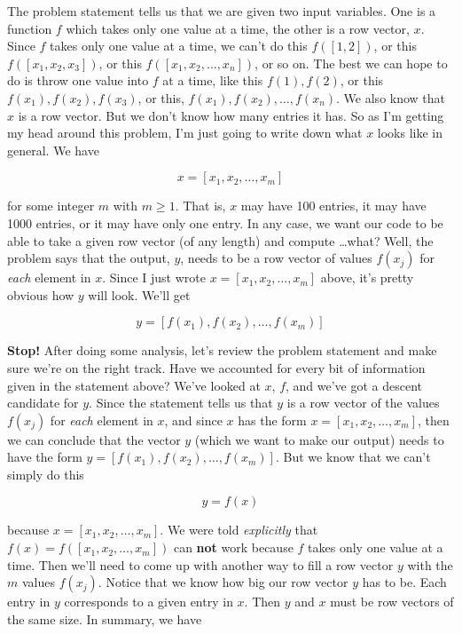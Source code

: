 \documentclass{article}
\begin{document}
The problem statement tells us that we are given two input variables. One is a function $f$ which takes only one value at a time, the other is a row vector, $x$. Since $f$ takes only one value at a time, we can't do this $f([1, 2])$, or this $f([x_1, x_2, x_3])$, or this $f([x_1, x_2, \dots, x_n])$, or so on. The best we can hope to do is throw one value into $f$ at a time, like this $f(1), f(2)$, or this $f(x_1), f(x_2), f(x_3)$, or this, $f(x_1), f(x_2), \dots, f(x_n)$. We also know that $x$ is a row vector. But we don't know how many entries it has. So as I'm getting my head around this problem, I'm just going to write down what $x$ looks like in general. We have

\[
x = [x_1, x_2, \dots, x_m]
\]

{\setlength{\parindent}{0cm}
for some integer $m$ with $m \geq 1$. That is, $x$ may have 100 entries, it may have 1000 entries, or it may have only one entry. In any case, we want our code to be able to take a given row vector (of any length) and compute \dots what? Well, the problem says that the output, $y$, needs to be a row vector of values $f(x_j)$ for \textit{each} element in $x$. Since I just wrote $x = [x_1, x_2, \dots, x_m]$ above, it's pretty obvious how $y$ will look. We'll get}

\[
y = [ f(x_1), f(x_2), \dots, f(x_m)]
\]

{\setlength{\parindent}{0cm}
\textbf{Stop!} After doing some analysis, let's review the problem statement and make sure we're on the right track. Have we accounted for every bit of information given in the statement above? We've looked at $x$, $f$, and we've got a descent candidate for $y$. Since the statement tells us that $y$ is a row vector of the values $f(x_j)$ for \textit{each} element in $x$, and since $x$ has the form $x = [x_1, x_2, \dots, x_m]$, then we can conclude that the vector $y$ (which we want to make our output) needs to have the form $y = [ f(x_1), f(x_2), \dots, f(x_m)]$. But we know that we can't simply do this}

\[
y = f(x)
\]

{\setlength{\parindent}{0cm}
because $x = [ x_1, x_2, \dots, x_m]$. We were told \textit{explicitly} that $f(x) = f([x_1, x_2, \dots, x_m])$ can \textbf{not} work because $f$ takes only one value at a time. Then we'll need to come up with another way to fill a row vector $y$ with the $m$ values $f(x_j)$. Notice that we know how big our row vector $y$ has to be. Each entry in $y$ corresponds to a given entry in $x$. Then $y$ and $x$ must be row vectors of the same size. In summary, we have}
\end{document}
